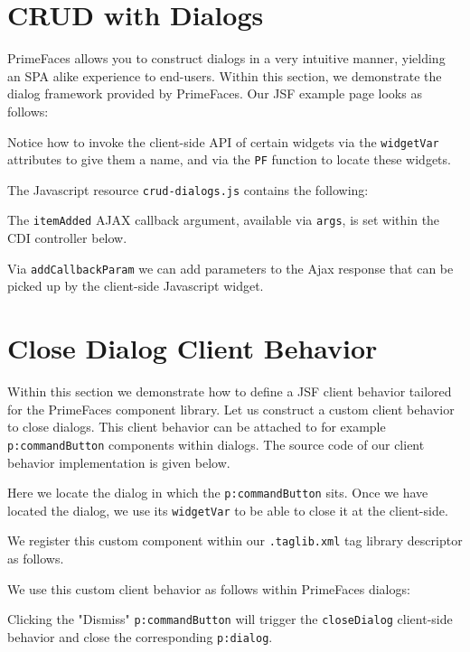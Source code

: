 \section{CRUD with Dialogs}
PrimeFaces allows you to construct dialogs in a very intuitive manner, yielding an SPA alike experience to end-users.
Within this section, we demonstrate the dialog framework provided by PrimeFaces.
Our JSF example page looks as follows:

Notice how to invoke the client-side API of certain widgets via the \texttt{widgetVar} attributes to give them a name, and via the \texttt{PF} function to locate these widgets.

The Javascript resource \texttt{crud-dialogs.js} contains the following:

The \texttt{itemAdded} AJAX callback argument, available via \texttt{args}, is set within the CDI controller below.


Via \texttt{addCallbackParam} we can add parameters to the Ajax response that can be picked up by the client-side Javascript widget.

\section{Close Dialog Client Behavior}
Within this section we demonstrate how to define a JSF client behavior tailored for the PrimeFaces component library.
Let us construct a custom client behavior to close dialogs.
This client behavior can be attached to for example \texttt{p:commandButton} components within dialogs.
The source code of our client behavior implementation is given below.

Here we locate the dialog in which the \texttt{p:commandButton} sits.
Once we have located the dialog, we use its \texttt{widgetVar} to be able to close it at the client-side.

We register this custom component within our \texttt{.taglib.xml} tag library descriptor as follows.


We use this custom client behavior as follows within PrimeFaces dialogs:

Clicking the "Dismiss" \texttt{p:commandButton} will trigger the \texttt{closeDialog} client-side behavior and close the corresponding \texttt{p:dialog}.

